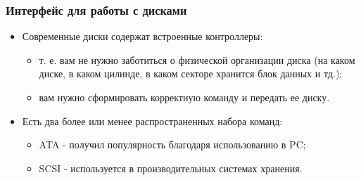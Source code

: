 \begin{frame}
\frametitle{Интерфейс для работы с дисками}
\begin{itemize}
  \item Современные диски содержат встроенные контроллеры:
  \begin{itemize}
    \item т. е. вам не нужно заботиться о физической организации диска (на каком
    диске, в каком цилинде, в каком секторе хранится блок данных и тд.);
    \item вам нужно сформировать корректную команду и передать ее диску.
  \end{itemize}
  \item Есть два более или менее распространенных набора команд:
  \begin{itemize}
    \item ATA - получил популярность благодаря использованию в PC;
    \item SCSI - используется в производительных системах хранения.
  \end{itemize}
\end{itemize}
\end{frame}
